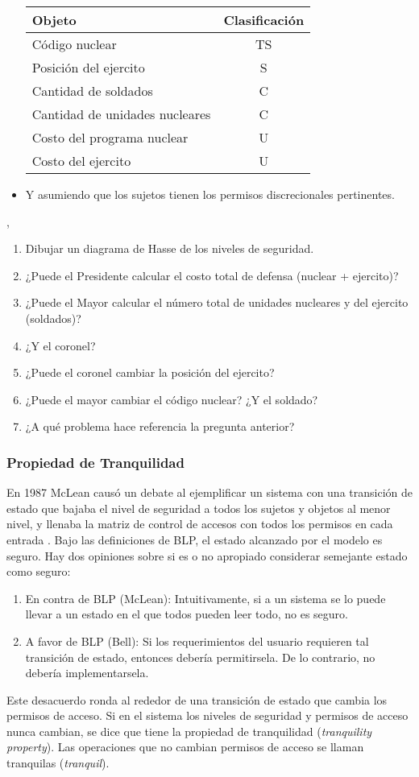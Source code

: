 \documentclass[main.tex]{subfiles}
\begin{document}
\begin{exercise}
\begin{itemize}
    \begin{tabular}{l|c}
      Objeto & Clasificación \\
      \hline
  Código nuclear & TS\\
  Posición del ejercito & S\\
  Cantidad de soldados & C\\
  Cantidad de unidades nucleares & C\\
  Costo del programa nuclear & U\\
  Costo del ejercito & U
    \end{tabular}
  \item Y asumiendo que los sujetos tienen los permisos discrecionales
    pertinentes.
  \end{itemize}, 
\begin{enumerate}
\itemsep0em 
  \item Dibujar un diagrama de Hasse de los niveles de seguridad.
  \item ¿Puede el Presidente calcular el costo total de defensa (nuclear + ejercito)?
  \item ¿Puede el Mayor calcular el número total de unidades nucleares y del
    ejercito (soldados)?
  \item ¿Y el coronel?
  \item ¿Puede el coronel cambiar la posición del ejercito? 
  \item ¿Puede el mayor cambiar el código nuclear? ¿Y el soldado?
  \item ¿A qué problema hace referencia la pregunta anterior?
\end{enumerate}
\end{exercise}
\subsubsection*{Propiedad de Tranquilidad} 
En 1987 McLean causó un debate al ejemplificar un sistema con una transición de
estado que bajaba el nivel de seguridad a todos los sujetos y objetos al menor
nivel, y llenaba la matriz de control de accesos con todos los permisos en cada
entrada \cite{m87}. Bajo las definiciones de BLP, el estado alcanzado por el modelo es
seguro. Hay dos opiniones sobre si es o no apropiado considerar semejante estado
como seguro:
\begin{enumerate}
  \item En contra de BLP (McLean): Intuitivamente, si a un sistema se lo puede
    llevar a un estado en el que todos pueden leer todo, no es seguro. 
  \item A favor de BLP (Bell): Si los requerimientos del usuario requieren tal
    transición de estado, entonces debería permitirsela. De lo contrario, no
    debería implementarsela.
\end{enumerate}
Este desacuerdo ronda al rededor de una transición de estado que cambia los
permisos de acceso. Si en el sistema los niveles de seguridad y permisos de
acceso nunca cambian, se dice que tiene la propiedad de tranquilidad
(\textit{tranquility property}). Las operaciones que no cambian permisos de
acceso se llaman tranquilas (\textit{tranquil}).
\end{document}
